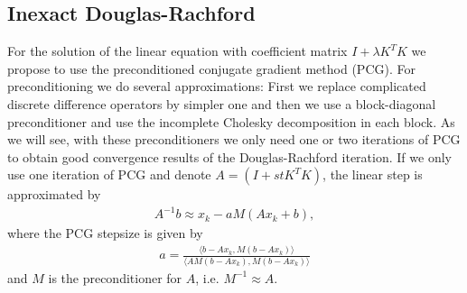\documentclass[twocolumn,envcountsame]{svjour3}
\begin{document}
 \subsection{Inexact Douglas-Rachford}
 \label{sec:idr}

 For the solution of the linear equation with coefficient matrix
 $I + \lambda K^TK$ we propose to use the preconditioned conjugate
 gradient method (PCG). For preconditioning we do several
 approximations: First we replace complicated discrete difference operators
 by simpler one and then we use a block-diagonal preconditioner and
 use the incomplete Cholesky decomposition in each block. As we will see, with these
 preconditioners we only need one or two iterations of PCG to obtain
 good convergence results of the Douglas-Rachford iteration.  If we
 only use one iteration of PCG and denote $A=(I+stK^TK)$, the linear
 step is approximated by
 \begin{align*}
   A^{-1}b\approx x_k -a M(Ax_k+b),
 \end{align*}
 where the PCG stepsize is given by 
 \begin{align*}
   a=\frac{\langle b-Ax_k,M(b-Ax_k)\rangle}{\langle
 AM(b-Ax_k),M(b-Ax_k)\rangle}
 \end{align*}
 and $M$ is the preconditioner for $A$, i.e. $M^{-1}\approx A$.
 
\end{document}
